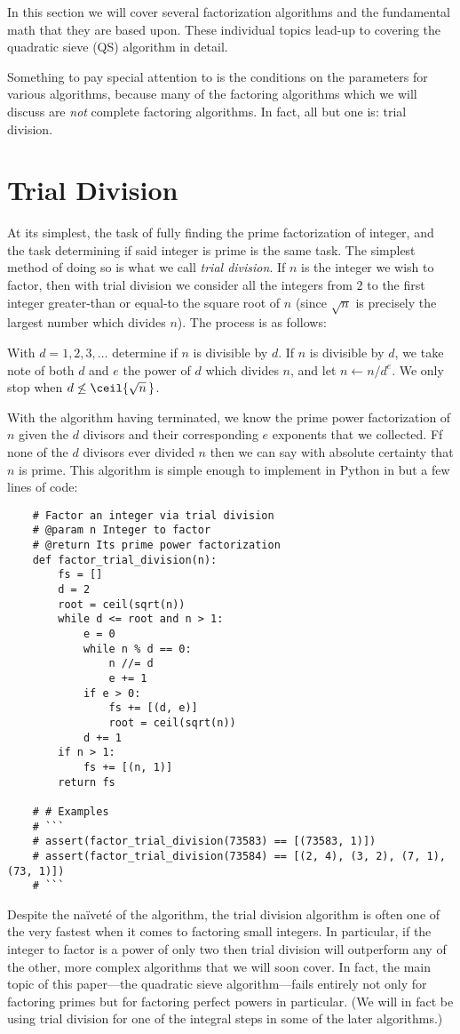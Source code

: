 \documentclass{report}
\begin{document}
In this section we will cover several factorization algorithms and the fundamental math that they
are based upon. These individual topics lead-up to covering the quadratic sieve (QS) algorithm
in detail.

Something to pay special attention to is the conditions on the parameters for various algorithms,
because many of the factoring algorithms which we will discuss are \emph{not} complete factoring
algorithms. In fact, all but one is: trial division.

\section{Trial Division}
At its simplest, the task of fully finding the prime factorization of integer, and the task
determining if said integer is prime is the same task. The simplest method of doing so is what we
call \emph{trial division}.
If $n$ is the integer we wish to factor, then with trial division we consider all the integers from
$2$ to the first integer greater-than or equal-to the square root of $n$ (since $\sqrt n$ is
precisely the largest number which divides $n$). The process is as follows:

With $d=1,2,3,\ldots$ determine if $n$ is divisible by $d$. If $n$ is divisible by $d$, we take note
of both $d$ and $e$ the power of $d$ which divides $n$, and let $n \gets n/d^e$. We only stop when
$d\not\le\ceil{\sqrt n\,}$.

With the algorithm having terminated, we know the prime power factorization of $n$ given the $d$
divisors and their corresponding $e$ exponents that we collected. Ff none of the $d$ divisors ever
divided $n$ then we can say with absolute certainty that $n$ is prime. This algorithm is simple
enough to implement in Python in but a few lines of code:
\begin{verbatim}
    # Factor an integer via trial division
    # @param n Integer to factor
    # @return Its prime power factorization
    def factor_trial_division(n):
        fs = []
        d = 2
        root = ceil(sqrt(n))
        while d <= root and n > 1:
            e = 0
            while n % d == 0:
                n //= d
                e += 1
            if e > 0:
                fs += [(d, e)]
                root = ceil(sqrt(n))
            d += 1
        if n > 1:
            fs += [(n, 1)]
        return fs

    # # Examples
    # ```
    # assert(factor_trial_division(73583) == [(73583, 1)])
    # assert(factor_trial_division(73584) == [(2, 4), (3, 2), (7, 1), (73, 1)])
    # ```
\end{verbatim}
Despite the naïveté of the algorithm, the trial division algorithm is often one of the very fastest
when it comes to factoring small integers. In particular, if the integer to factor is a power of
only two then trial division will outperform any of the other, more complex algorithms that we will
soon cover. In fact, the main topic of this paper---the quadratic sieve algorithm---fails entirely
not only for factoring primes but for factoring perfect powers in particular. (We will in fact be
using trial division for one of the integral steps in some of the later algorithms.)
\end{document}
